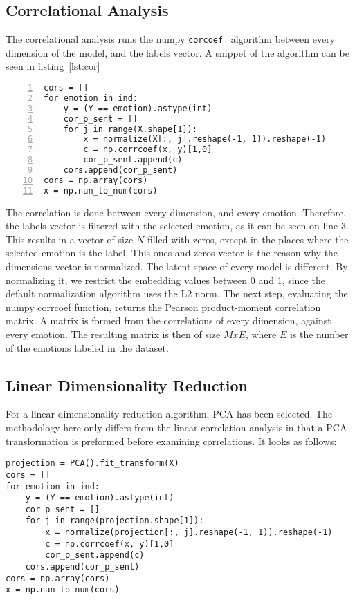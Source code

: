 \subsection{Correlational Analysis}\label{sub:Correlational Analysis}
The correlational analysis runs the numpy \lstinline{corcoef}~\cite{oliphant2006numpy} algorithm between every dimension of the model, and the labels vector. A snippet of the algorithm can be seen in listing~\ref{lst:cor}

\begin{lstlisting}[caption={Correlation Algorithm},label=lst:cor,frame=single,numbers=left]
cors = []
for emotion in ind:
    y = (Y == emotion).astype(int)
    cor_p_sent = []
    for j in range(X.shape[1]):
        x = normalize(X[:, j].reshape(-1, 1)).reshape(-1)
        c = np.corrcoef(x, y)[1,0]
        cor_p_sent.append(c)
    cors.append(cor_p_sent)
cors = np.array(cors)
x = np.nan_to_num(cors)
\end{lstlisting}

The correlation is done between every dimension, and every emotion. Therefore, the labels vector is filtered with the selected emotion, as it can be seen on line 3. This results in a vector of size $N$ filled with zeros, except in the places where the selected emotion is the label. This ones-and-zeros vector is the reason why the dimensions vector is normalized. The latent space of every model is different. By normalizing it, we restrict the embedding values between 0 and 1, since the default normalization algorithm uses the L2 norm.
The next step, evaluating the numpy corrcoef function, returns the Pearson product-moment correlation matrix.
A matrix is formed from the correlations of every dimension, against every emotion. The resulting matrix is then of size $MxE$, where $E$ is the number of the emotions labeled in the dataset.


\subsection{Linear Dimensionality Reduction}\label{sub:Linear Dimentionality Reduction}
For a linear dimensionality reduction algorithm, PCA has been selected. The methodology here only differs from the linear correlation analysis in that a PCA transformation is preformed before examining correlations. It looks as follows:

\begin{lstlisting}[caption={PCA correlation Algorithm},label=lst:pca,frame=single]
projection = PCA().fit_transform(X)
cors = []
for emotion in ind:
    y = (Y == emotion).astype(int)
    cor_p_sent = []
    for j in range(projection.shape[1]):
        x = normalize(projection[:, j].reshape(-1, 1)).reshape(-1)
        c = np.corrcoef(x, y)[1,0]
        cor_p_sent.append(c)
    cors.append(cor_p_sent)
cors = np.array(cors)
x = np.nan_to_num(cors)
\end{lstlisting}


